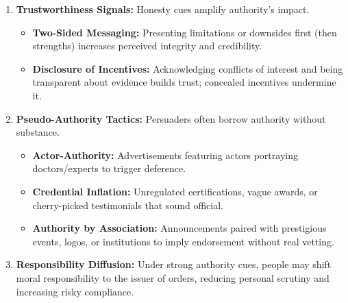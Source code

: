 \begin{enumerate}
    \item \textbf{Trustworthiness Signals:} Honesty cues amplify authority’s impact.
    \begin{itemize}
        \item \textbf{Two-Sided Messaging:} Presenting limitations or downsides first (then strengths) increases perceived integrity and credibility.
        \item \textbf{Disclosure of Incentives:} Acknowledging conflicts of interest and being transparent about evidence builds trust; concealed incentives undermine it.
    \end{itemize}

    \item \textbf{Pseudo-Authority Tactics:} Persuaders often borrow authority without substance.
    \begin{itemize}
        \item \textbf{Actor-Authority:} Advertisements featuring actors portraying doctors/experts to trigger deference.
        \item \textbf{Credential Inflation:} Unregulated certifications, vague awards, or cherry-picked testimonials that sound official.
        \item \textbf{Authority by Association:} Announcements paired with prestigious events, logos, or institutions to imply endorsement without real vetting.
    \end{itemize}

    \item \textbf{Responsibility Diffusion:} Under strong authority cues, people may shift moral responsibility to the issuer of orders, reducing personal scrutiny and increasing risky compliance.
\end{enumerate}

